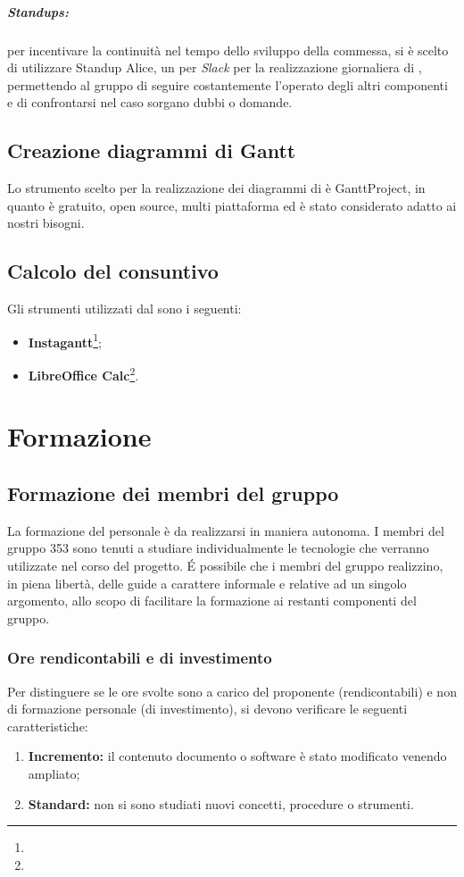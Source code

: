 \documentclass[NormeDiProgetto.tex]{subfiles}
\begin{document}
	\subparagraph{Standups:} per incentivare la continuità nel tempo dello sviluppo della commessa, si è scelto di utilizzare Standup Alice, un  per \emph{Slack} per la realizzazione giornaliera di , permettendo al gruppo di seguire costantemente l'operato degli altri componenti e di confrontarsi nel caso sorgano dubbi o domande.
	\subsection{Creazione diagrammi di Gantt}
	Lo strumento scelto per	la realizzazione dei diagrammi di  è GanttProject, in quanto è gratuito, open source, multi piattaforma ed è stato considerato adatto ai nostri bisogni.
	\subsection{Calcolo del consuntivo}
	Gli strumenti utilizzati dal \respdiprog{} sono i seguenti:
	\begin{itemize}
		\item \textbf{Instagantt}\footnote{};
		\item \textbf{LibreOffice Calc}\footnote{}.
	\end{itemize}
	
	\section{Formazione}
	\subsection{Formazione dei membri del gruppo}
		La formazione del personale è da realizzarsi in maniera autonoma. I membri del gruppo 353 sono tenuti a studiare individualmente le tecnologie che verranno utilizzate nel corso del progetto. \'{E} possibile che i membri del gruppo realizzino, in piena libertà, delle guide a carattere informale e relative ad un singolo argomento, allo scopo di facilitare la formazione ai restanti componenti del gruppo.
		
	\subsubsection{Ore rendicontabili e di investimento}
	Per distinguere se le ore svolte sono a carico del proponente (rendicontabili) e non di formazione personale (di investimento), si devono verificare le seguenti caratteristiche:
	\begin{enumerate}
		\item \textbf{Incremento:} il contenuto documento o software è stato modificato venendo ampliato;
		\item \textbf{Standard:} non si sono studiati nuovi concetti, procedure o strumenti.
	\end{enumerate}
\end{document}
